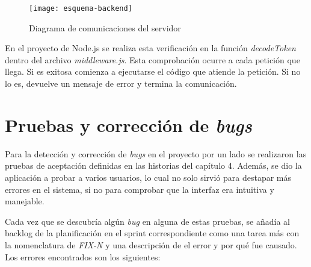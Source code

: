 \begin{figure}[h]
    \centering
    \texttt{[image: esquema-backend]}
    \caption[Diagrama de comunicaciones del servidor]{Diagrama de comunicaciones del servidor}
    \label{fig:esquemabackend}
\end{figure}

En el proyecto de Node.js se realiza esta verificación en la función \textit{decodeToken} dentro del archivo \textit{middleware.js}. Esta comprobación ocurre a cada petición que llega. Si es exitosa comienza a ejecutarse el código que atiende la petición. Si no lo es, devuelve un mensaje de error y termina la comunicación.

\section{Pruebas y corrección de \textit{bugs}}

Para la detección y corrección de \textit{bugs} en el proyecto por un lado se realizaron las pruebas de aceptación definidas en las historias del capítulo 4. Además, se dio la aplicación a probar a varios usuarios, lo cual no solo sirvió para destapar más errores en el sistema, si no para comprobar que la interfaz era intuitiva y manejable.

Cada vez que se descubría algún \textit{bug} en alguna de estas pruebas, se añadía al backlog de la planificación en el sprint correspondiente como una tarea más con la nomenclatura de \textit{FIX-N} y una descripción de el error y por qué fue causado. Los errores encontrados son los siguientes:

\begin{table}[H]
\label{FIX-01}
\end{table}

